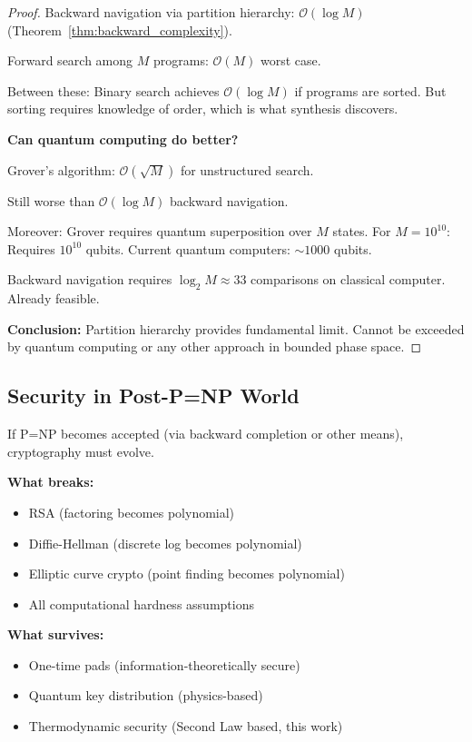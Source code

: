 \documentclass[twocolumn,10pt]{article}
\theoremstyle{definition}
\theoremstyle{remark}
\newcommand{\bigO}{\mathcal{O}}
\begin{document}
\begin{proof}
Backward navigation via partition hierarchy: $\bigO(\log M)$ (Theorem~\ref{thm:backward_complexity}).

Forward search among $M$ programs: $\bigO(M)$ worst case.

Between these: Binary search achieves $\bigO(\log M)$ if programs are sorted. But sorting requires knowledge of order, which is what synthesis discovers.

\vspace{0.2cm}
\noindent\textbf{Can quantum computing do better?}

Grover's algorithm\cite{grover1996}: $\bigO(\sqrt{M})$ for unstructured search.

Still worse than $\bigO(\log M)$ backward navigation.

Moreover: Grover requires quantum superposition over $M$ states. For $M=10^{10}$: Requires $10^{10}$ qubits. Current quantum computers: $\sim 1000$ qubits.

Backward navigation requires $\log_2 M \approx 33$ comparisons on classical computer. Already feasible.

\vspace{0.2cm}
\noindent\textbf{Conclusion:} Partition hierarchy provides fundamental limit. Cannot be exceeded by quantum computing or any other approach in bounded phase space.
\end{proof}

\subsection{Security in Post-P=NP World}

If P=NP becomes accepted (via backward completion or other means), cryptography must evolve.

\vspace{0.2cm}
\noindent\textbf{What breaks:}
\begin{itemize}
\item RSA (factoring becomes polynomial)
\item Diffie-Hellman (discrete log becomes polynomial)
\item Elliptic curve crypto (point finding becomes polynomial)
\item All computational hardness assumptions
\end{itemize}

\textbf{What survives:}
\begin{itemize}
\item One-time pads (information-theoretically secure\cite{shannon1949})
\item Quantum key distribution (physics-based\cite{bennett1984})
\item Thermodynamic security (Second Law based, this work)
\end{itemize}
\end{document}
